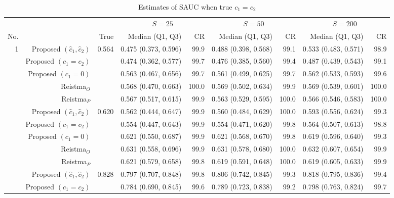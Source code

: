 \begin{table}

\caption{Estimates of SAUC when true $c_1 = c_2$}
\centering
\begin{threeparttable}
\begin{tabular}[t]{rrrrrrrrr}
\toprule
\multicolumn{1}{c}{} & \multicolumn{1}{c}{} & \multicolumn{1}{c}{} & \multicolumn{2}{c}{$S = 25$} & \multicolumn{2}{c}{$S = 50$} & \multicolumn{2}{c}{$S = 200$} \\
\cmidrule(l{3pt}r{3pt}){4-5} \cmidrule(l{3pt}r{3pt}){6-7} \cmidrule(l{3pt}r{3pt}){8-9}
No. &   & True & Median (Q1, Q3) & CR & Median (Q1, Q3) & CR & Median (Q1, Q3) & CR\\
\midrule
1 & Proposed $(\hat{c}_1, \hat{c}_2)$ & 0.564 & 0.475 (0.373, 0.596) & 99.9 & 0.488 (0.398, 0.568) & 99.1 & 0.533 (0.483, 0.571) & 98.9\\
 & Proposed $(c_1 = c_2)$ &  & 0.474 (0.362, 0.577) & 99.7 & 0.476 (0.385, 0.560) & 99.4 & 0.487 (0.439, 0.543) & 99.1\\
 & Proposed $(c_1 = 0)$ &  & 0.563 (0.467, 0.656) & 99.7 & 0.561 (0.499, 0.625) & 99.7 & 0.562 (0.533, 0.593) & 99.6\\
 & Reistma$_O$ &  & 0.568 (0.470, 0.663) & 100.0 & 0.569 (0.502, 0.634) & 99.9 & 0.569 (0.539, 0.601) & 100.0\\
 & Reistma$_P$ &  & 0.567 (0.517, 0.615) & 99.9 & 0.563 (0.529, 0.595) & 100.0 & 0.566 (0.546, 0.583) & 100.0\\
\addlinespace
2 & Proposed $(\hat{c}_1, \hat{c}_2)$ & 0.620 & 0.562 (0.444, 0.647) & 99.9 & 0.560 (0.484, 0.629) & 100.0 & 0.593 (0.556, 0.624) & 99.3\\
 & Proposed $(c_1 = c_2)$ &  & 0.554 (0.447, 0.643) & 99.9 & 0.554 (0.471, 0.620) & 99.8 & 0.564 (0.507, 0.613) & 98.8\\
 & Proposed $(c_1 = 0)$ &  & 0.621 (0.550, 0.687) & 99.9 & 0.621 (0.568, 0.670) & 99.8 & 0.619 (0.596, 0.640) & 99.3\\
 & Reistma$_O$ &  & 0.631 (0.558, 0.696) & 99.9 & 0.631 (0.578, 0.680) & 100.0 & 0.632 (0.607, 0.654) & 99.9\\
 & Reistma$_P$ &  & 0.621 (0.579, 0.658) & 99.8 & 0.619 (0.591, 0.648) & 100.0 & 0.619 (0.605, 0.633) & 99.9\\
\addlinespace
3 & Proposed $(\hat{c}_1, \hat{c}_2)$ & 0.828 & 0.797 (0.707, 0.848) & 99.8 & 0.806 (0.742, 0.845) & 99.3 & 0.818 (0.795, 0.836) & 99.4\\
 & Proposed $(c_1 = c_2)$ &  & 0.784 (0.690, 0.845) & 99.6 & 0.789 (0.723, 0.838) & 99.2 & 0.798 (0.763, 0.824) & 99.7\\

\end{tabular}
\end{threeparttable}
\end{table}
